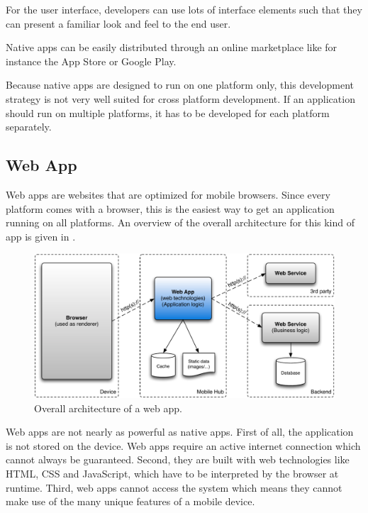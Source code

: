 \npar For the user interface, developers can use lots of interface elements such that they can present a familiar look and feel to the end user. 

\npar Native apps can be easily distributed through an online marketplace like for instance the App Store or Google Play. 

\npar Because native apps are designed to run on one platform only, this development strategy is not very well suited for cross platform development. If an application should run on multiple platforms, it has to be developed for each platform separately. 


\subsection{Web App}

\npar Web apps are websites that are optimized for mobile browsers. Since every platform comes with a browser, this is the easiest way to get an application running on all platforms. An overview of the overall architecture for this kind of app is given in .

\begin{figure}[h!]
    \begin{center}
        \includegraphics[width=\textwidth]{figs/web.pdf}
        \caption{
            Overall architecture of a web app.
        }
        \label{fig:web}
    \end{center}
\end{figure}

\npar Web apps are not nearly as powerful as native apps. First of all, the application is not stored on the device. Web apps require an active internet connection which cannot always be guaranteed. Second, they are built with web technologies like HTML, CSS and JavaScript, which have to be interpreted by the browser at runtime. Third, web apps cannot access the system which means they cannot make use of the many unique features of a mobile device. 

